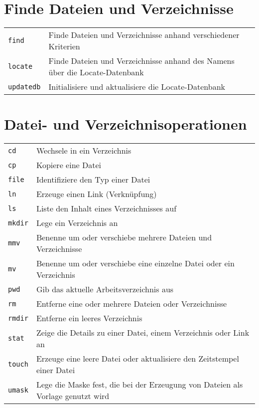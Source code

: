 \documentclass[10pt,a4paper]{article}
\begin{document}
\begin{multicols}{2}
\vfill

\section{Finde Dateien und Verzeichnisse}
\begin{tabular}{ p{2.5cm} p{8.5cm} }
  \hline
  \texttt{find} & Finde Dateien und Verzeichnisse anhand \newline verschiedener Kriterien \\
  \rowcolor{Gray}
  \texttt{locate} & Finde Dateien und Verzeichnisse anhand des Namens über die Locate-Datenbank \\
  \texttt{updatedb} & Initialisiere und aktualisiere die Locate-Datenbank \\
  \hline
\end{tabular}

\columnbreak

\section{Datei- und Verzeichnisoperationen}
\begin{tabular}{ p{2.5cm} p{8.5cm} }
  \hline
  \texttt{cd} & Wechsele in ein Verzeichnis \\
  \rowcolor{Gray}
  \texttt{cp} & Kopiere eine Datei \\
  \texttt{file} & Identifiziere den Typ einer Datei\\
  \rowcolor{Gray}
  \texttt{ln} & Erzeuge einen Link (Verknüpfung) \\
  \texttt{ls} & Liste den Inhalt eines Verzeichnisses auf \\
  \rowcolor{Gray}
  \texttt{mkdir} & Lege ein Verzeichnis an\\
  \texttt{mmv} & Benenne um oder verschiebe mehrere Dateien und Verzeichnisse \\
  \rowcolor{Gray}
  \texttt{mv} & Benenne um oder verschiebe eine einzelne Datei oder ein Verzeichnis \\
  \texttt{pwd} & Gib das aktuelle Arbeitsverzeichnis aus \\
  \rowcolor{Gray}
  \texttt{rm} & Entferne eine oder mehrere Dateien oder Verzeichnisse \\
  \texttt{rmdir} & Entferne ein leeres Verzeichnis \\
  \rowcolor{Gray}
  \texttt{stat} & Zeige die Details zu einer Datei, einem Verzeichnis oder Link an \\
  \texttt{touch} & Erzeuge eine leere Datei oder aktualisiere den Zeitstempel einer Datei \\
  \rowcolor{Gray}
  \texttt{umask} & Lege die Maske fest, die bei der Erzeugung von Dateien als Vorlage genutzt wird \\
  \hline
\end{tabular}


\end{multicols}
\end{document}
